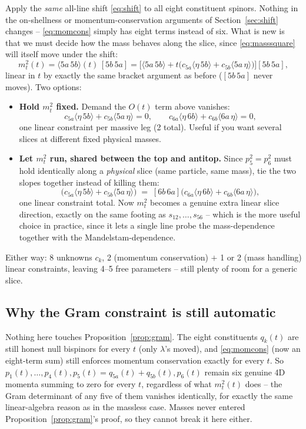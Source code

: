 \documentclass[11pt]{article}
\newcommand{\ang}[2]{\langle #1\,#2\rangle}
\newcommand{\sq}[2]{[#1\,#2]}
\newcommand{\lam}{\lambda}
\theoremstyle{definition}
\begin{document}
Apply the \emph{same} all-line shift \eqref{eq:shift} to all eight constituent spinors. Nothing
in the on-shellness or momentum-conservation arguments of Section~\ref{sec:shift} changes --
\eqref{eq:momcons} simply has eight terms instead of six. What is new is that we must decide how
the mass behaves along the slice, since \eqref{eq:masssquare} will itself move under the shift:
\begin{equation}
m_t^2(t) = \ang{5a}{5b}(t)\,\sq{5b}{5a}
         = \Big[\ang{5a}{5b} + t\big(c_{5a}\ang{\eta}{5b}+c_{5b}\ang{5a}{\eta}\big)\Big]\sq{5b}{5a},
\end{equation}
linear in $t$ by exactly the same bracket argument as before ($\sq{5b}{5a}$ never moves). Two
options:
\begin{itemize}
\item \textbf{Hold $m_t^2$ fixed.} Demand the $O(t)$ term above vanishes:
  \begin{equation}
  c_{5a}\ang{\eta}{5b}+c_{5b}\ang{5a}{\eta} = 0, \qquad
  c_{6a}\ang{\eta}{6b}+c_{6b}\ang{6a}{\eta} = 0,
  \end{equation}
  one linear constraint per massive leg (2 total). Useful if you want several slices at different
  fixed physical masses.
\item \textbf{Let $m_t^2$ run, shared between the top and antitop.} Since $p_5^2=p_6^2$ must hold
  identically along a \emph{physical} slice (same particle, same mass), tie the two slopes
  together instead of killing them:
  \begin{equation}
  \sq{5b}{5a}\big(c_{5a}\ang{\eta}{5b}+c_{5b}\ang{5a}{\eta}\big)
  \;=\;
  \sq{6b}{6a}\big(c_{6a}\ang{\eta}{6b}+c_{6b}\ang{6a}{\eta}\big),
  \end{equation}
  one linear constraint total. Now $m_t^2$ becomes a genuine extra linear slice direction,
  exactly on the same footing as $s_{12},\dots,s_{56}$ -- which is the more useful choice in
  practice, since it lets a single line probe the mass-dependence together with the
  Mandelstam-dependence.
\end{itemize}
Either way: 8 unknowns $c_k$, 2 (momentum conservation) $+$ 1 or 2 (mass handling) linear
constraints, leaving 4--5 free parameters -- still plenty of room for a generic slice.

\subsection{Why the Gram constraint is still automatic}

Nothing here touches Proposition~\ref{prop:gram}. The eight constituents $q_k(t)$ are still
honest null bispinors for every $t$ (only $\lam$'s moved), and \eqref{eq:momcons} (now an
eight-term sum) still enforces momentum conservation exactly for every $t$. So
$p_1(t),\dots,p_4(t), p_5(t){=}q_{5a}(t){+}q_{5b}(t), p_6(t)$ remain six genuine 4D momenta
summing to zero for every $t$, regardless of what $m_t^2(t)$ does -- the Gram determinant
of any five of them vanishes identically, for exactly the same linear-algebra reason as in the
massless case. Masses never entered Proposition~\ref{prop:gram}'s proof, so they cannot break it
here either.
\end{document}

